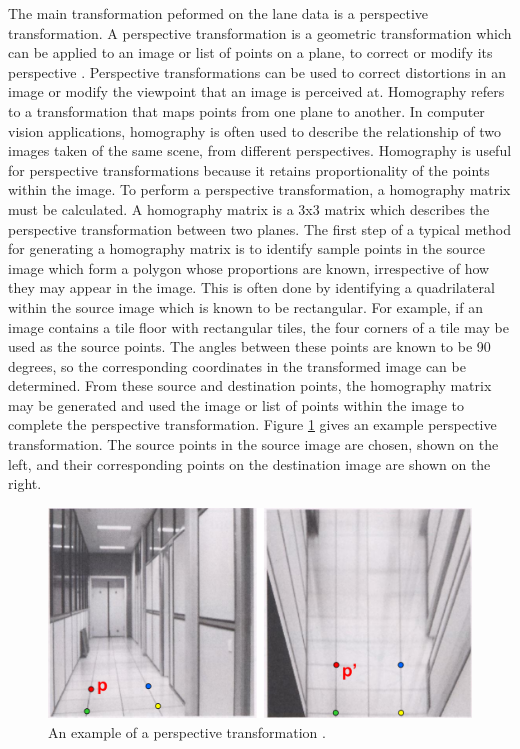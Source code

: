 \documentclass[titlepage, draft]{article}
\begin{document}
The main transformation peformed on the lane data is a perspective transformation. A perspective transformation is a geometric transformation which can be applied to an image or list of points on a plane, to correct or modify its perspective \cite{CarletonHomography}. Perspective transformations can be used to correct distortions in an image or modify the viewpoint that an image is perceived at.
Homography refers to a transformation that maps points from one plane to another. In computer vision applications, homography is often used to describe the relationship of two images taken of the same scene, from different perspectives. Homography is useful for perspective transformations because it retains proportionality of the points within the image. To perform a perspective transformation, a homography matrix must be calculated. A homography matrix is a 3x3 matrix which describes the perspective transformation between two planes.
The first step of a typical method for generating a homography matrix is to identify sample points in the source image which form a polygon whose proportions are known, irrespective of how they may appear in the image. This is often done by identifying a quadrilateral within the source image which is known to be rectangular. For example, if an image contains a tile floor with rectangular tiles, the four corners of a tile may be used as the source points. The angles between these points are known to be 90 degrees, so the corresponding coordinates in the transformed image can be determined. From these source and destination points, the homography matrix may be generated and used the image or list of points within the image to complete the perspective transformation. Figure \ref{CarletonTransform} gives an example perspective transformation. The source points in the source image are chosen, shown on the left, and their corresponding points on the destination image are shown on the right.
\begin{figure}
	\centering
	\includegraphics[width=6in]{transform_carleton.png}
	\caption{An example of a perspective transformation \cite{CarletonHomography}.}
	\label{CarletonTransform}
\end{figure}
\end{document}
